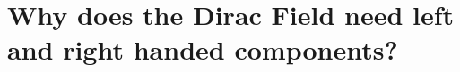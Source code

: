 \documentclass{article}
\begin{document}
\section{Why does the Dirac Field need left and right handed components?}

%	
%	
%	
%	
%	
%	
%	
%	
%	
%	
\end{document}
